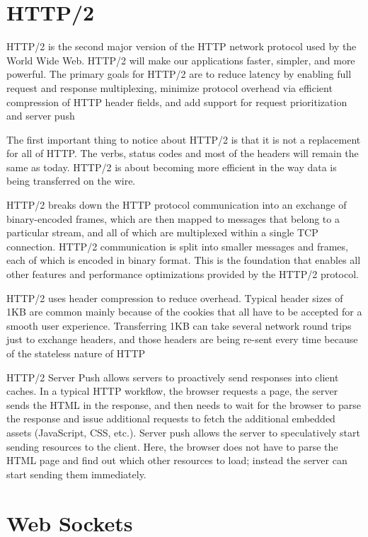 \section{HTTP/2}
\label{section:http2}
HTTP/2 is the second major version of the HTTP network protocol used by the World Wide Web. HTTP/2 will make our applications faster, simpler, and more powerful. The primary goals for HTTP/2 are to reduce latency by enabling full request and response multiplexing, minimize protocol overhead via efficient compression of HTTP header fields, and add support for request prioritization and server push\citep{thesis:state10}

The first important thing to notice about HTTP/2 is that it is not a replacement for all of HTTP. The verbs, status codes and most of the headers will remain the same as today. HTTP/2 is about becoming more efficient in the way data is being transferred on the wire\citep{thesis:state11}.

HTTP/2 breaks down the HTTP protocol communication into an exchange of binary-encoded frames, which are then mapped to messages that belong to a particular stream, and all of which are multiplexed within a single TCP connection. HTTP/2 communication is split into smaller messages and frames, each of which is encoded in binary format. This is the foundation that enables all other features and performance optimizations provided by the HTTP/2 protocol.

HTTP/2 uses header compression to reduce overhead. Typical header sizes of 1KB are common mainly because of the cookies that all have to be accepted for a smooth user experience. Transferring 1KB can take several network round trips just to exchange headers, and those headers are being re-sent every time because of the stateless nature of HTTP

HTTP/2 Server Push allows servers to proactively send responses into client caches. In a typical HTTP workflow, the browser requests a page, the server sends the HTML in the response, and then needs to wait for the browser to parse the response and issue additional requests to fetch the additional embedded assets (JavaScript, CSS, etc.). Server push allows the server to speculatively start sending resources to the client. Here, the browser does not have to parse the HTML page and find out which other resources to load; instead the server can start sending them immediately.
\section{Web Sockets}
\label{section:websockets}

